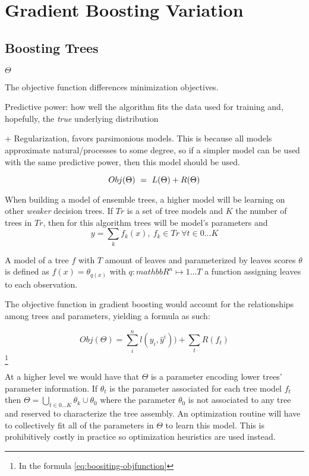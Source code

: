 \section{Gradient Boosting Variation}

\subsection{Boosting Trees    }

$\Theta$

The objective function differences minimization objectives. 

Predictive power: how well the algorithm fits the data used for training and, hopefully, the \textit{true} underlying distribution

+ Regularization, favors parsimonious models. This is because all models approximate natural/processes to some degree, so if a simpler model can be used with the same predictive power, then this model should be used.  

\begin{equation} \label{eq:objFunction}
Obj(\Theta) \ = \ L(\Theta) + R(\Theta)
\\
\end{equation}

When building a model of ensemble trees, a higher model will be learning on other \textit{weaker} decision trees. If $Tr$ is a set of tree models and $K$ the number of trees in $Tr$, then for this algorithm trees will be model's parameters and
\[ y = \sum_k f_k(x) , \ f_k \in Tr \ \forall t \in {0...K}\]

A model of a tree $f$ with $T$ amount of leaves and parameterized by leaves scores $\theta$ is defined as $f(x) = \theta_{q(x)}$  with $q : mathbb{R}^n \mapsto {1...T}$ a function assigning leaves to each observation. 

The objective function in gradient boosting would account for the relationships among trees and parameters, yielding a formula as such:
 
\[ Obj(\Theta) = \sum_i^n l(y_i,\hat{y}^i))  +  \sum_t R(f_t) \] \label{eq:boositing-objfunction} \footnote{In the formula \ref{eq:boositing-objfunction} }
%    

At a higher level we would have that $\Theta$ is a parameter encoding lower trees' parameter information. If $\theta_t$ is the parameter associated for each tree model $f_t$ then $\Theta =  \bigcup_{t \in {0...K}} \theta_k  \cup \theta_0$ where the parameter $\theta_0$ is not associated to any tree and reserved to characterize the tree assembly. An optimization routine will have to collectively fit all of the parameters in $\Theta$ to learn this model. This is prohibitively costly in practice so optimization heuristics are used instead. 

